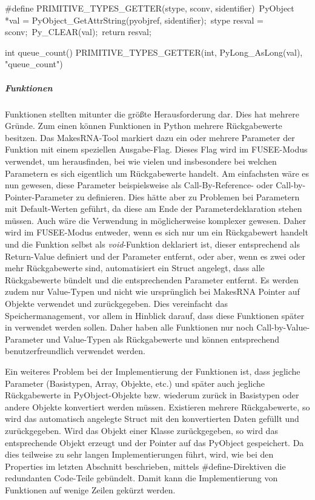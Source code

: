 \begin{code}[caption={Beispiel für die Vereinfachung durch \#define-Direktiven},label={lst:getdef}]
#define PRIMITIVE_TYPES_GETTER(stype, sconv, sidentifier)\
	PyObject *val = PyObject_GetAttrString(pyobjref, sidentifier);\
	stype resval = sconv;\
	Py_CLEAR(val);\
	return resval;
\end{code}

\begin{code}[caption={Beispiel für die Implementierung einer Getter-Funktion},label={lst:getimp}]
int queue_count() {
	PRIMITIVE_TYPES_GETTER(int, PyLong_AsLong(val),                 "queue_count")
}
\end{code}

\subparagraph{Funktionen}

Funktionen stellten mitunter die größte Herausforderung dar. Dies hat mehrere Gründe. Zum einen können Funktionen in Python mehrere Rückgabewerte besitzen. Das MakesRNA-Tool markiert dazu ein oder mehrere Parameter der Funktion mit einem speziellen Ausgabe-Flag. Dieses Flag wird im FUSEE-Modus verwendet, um herausfinden, bei wie vielen und insbesondere bei welchen Parametern es sich eigentlich um Rückgabewerte handelt. Am einfachsten wäre es nun gewesen, diese Parameter beispielsweise als Call-By-Reference- oder Call-by-Pointer-Parameter zu definieren. Dies hätte aber zu Problemen bei Parametern mit Default-Werten geführt, da diese am Ende der Parameterdeklaration stehen müssen. Auch wäre die Verwendung in \CS{} möglicherweise komplexer gewesen. Daher wird im FUSEE-Modus entweder, wenn es sich nur um ein Rückgabewert handelt und die Funktion selbst als \emph{void}-Funktion deklariert ist, dieser entsprechend als Return-Value definiert und der Parameter entfernt, oder aber, wenn es zwei oder mehr Rückgabewerte sind, automatisiert ein Struct angelegt, dass alle Rückgabewerte bündelt und die entsprechenden Parameter entfernt. Es werden zudem nur Value-Typen und nicht wie ursprünglich bei MakesRNA Pointer auf Objekte verwendet und zurückgegeben. Dies vereinfacht das Speichermanagement, vor allem in Hinblick darauf, dass diese Funktionen später in \CS verwendet werden sollen. Daher haben alle Funktionen nur noch Call-by-Value-Parameter und Value-Typen als Rückgabewerte und können entsprechend benutzerfreundlich verwendet werden. 

Ein weiteres Problem bei der Implementierung der Funktionen ist, dass jegliche Parameter (Basistypen, Array, Objekte, etc.) und später auch jegliche Rückgabewerte in PyObject-Objekte bzw. wiederum zurück in Basistypen oder andere Objekte konvertiert werden müssen. Existieren mehrere Rückgabewerte, so wird das automatisch angelegte Struct mit den konvertierten Daten gefüllt und zurückgegeben. Wird das Objekt einer Klasse zurückgegeben, so wird das entsprechende Objekt erzeugt und der Pointer auf das PyObject gespeichert. Da dies teilweise zu sehr langen Implementierungen führt, wird, wie bei den Properties im letzten Abschnitt beschrieben, mittels \#define-Direktiven die redundanten Code-Teile gebündelt. Damit kann die Implementierung von Funktionen auf wenige Zeilen gekürzt werden.

